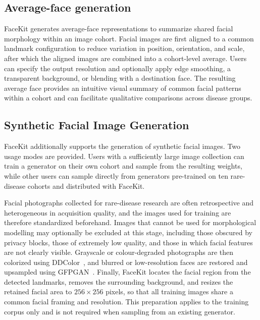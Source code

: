 \documentclass[11pt]{article}
\begin{document}
\subsection{Average-face generation}

FaceKit generates average-face representations to summarize shared facial morphology within an image cohort. Facial images are first aligned to a common landmark configuration to reduce variation in position, orientation, and scale, after which the aligned images are combined into a cohort-level average. Users can specify the output resolution and optionally apply edge smoothing, a transparent background, or blending with a destination face. The resulting average face provides an intuitive visual summary of common facial patterns within a cohort and can facilitate qualitative comparisons across disease groups.

\subsection{Synthetic Facial Image Generation}

FaceKit additionally supports the generation of synthetic facial images.
Two usage modes are provided. Users with a sufficiently large image
collection can train a generator on their own cohort and sample from the
resulting weights, while other users can sample
directly from generators pre-trained on ten rare-disease cohorts and
distributed with FaceKit.

Facial photographs collected for rare-disease research are often
retrospective and heterogeneous in acquisition quality, and the images used
for training are therefore standardized beforehand. Images that cannot be
used for morphological modelling may optionally be excluded at this stage,
including those obscured by privacy blocks, those of extremely low quality,
and those in which facial features are not clearly visible. Grayscale or
colour-degraded photographs are then colorized using DDColor~\cite{ddcolor},
and blurred or low-resolution faces are restored and upsampled using
GFPGAN~\cite{gfpgan}. Finally, FaceKit locates the facial region from the
detected landmarks, removes the surrounding background, and resizes the
retained facial area to $256\times256$ pixels, so that all training images
share a common facial framing and resolution. This preparation applies to
the training corpus only and is not required when sampling from an existing
generator.
\end{document}
